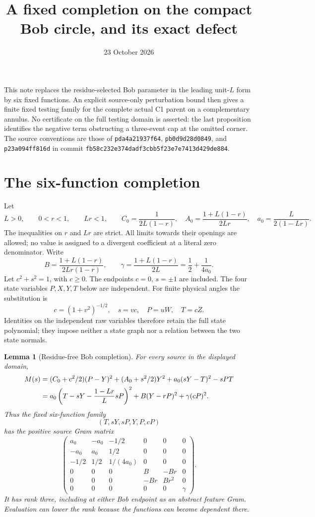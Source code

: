 \documentclass[11pt]{article}
\title{A fixed completion on the compact Bob circle, and its exact defect}
\author{}
\date{23 October 2026}
\newtheorem{lemma}{Lemma}
\begin{document}
\maketitle
\vspace{-1.5em}

This note replaces the residue-selected Bob parameter in the leading
unit-$L$ form by six fixed functions.  An explicit source-only
perturbation bound then gives a finite fixed testing family for the
complete actual C1 parent on a complementary annulus.  No certificate
on the full testing domain is asserted: the last proposition identifies
the negative term obstructing a three-event cap at the omitted corner.
The source conventions are those of
\texttt{pda4a21937f64}, \texttt{pb0d9d28d0849}, and
\texttt{p23a094ff816d} in commit
\texttt{fb58c232e374dadf3cbb5f23e7e7413d429de884}.

\section*{The six-function completion}

Let
\[
 L>0,\qquad 0<r<1,\qquad Lr<1,
 \qquad
 C_0=\frac1{2L(1-r)},\quad
 A_0=\frac{1+L(1-r)}{2Lr},\quad
 a_0=\frac L{2(1-Lr)}.
\]
The inequalities on $r$ and $Lr$ are strict.  All limits towards their
openings are allowed; no value is assigned to a divergent coefficient
at a literal zero denominator.  Write
\[
 B=\frac{1+L(1-r)}{2Lr(1-r)},\qquad
 \gamma=\frac{1+L(1-r)}{2L}
       =\frac12+\frac1{4a_0}.
\]
Let $c^2+s^2=1$, with $c\geq0$.  The endpoints $c=0$, $s=\pm1$
are included.  The four state variables $P,X,Y,T$ below are independent.
For finite physical angles the substitution is
\[
 c=(1+v^2)^{-1/2},\quad s=vc,\quad P=uW,\quad T=cZ.
\]
Identities on the independent raw variables therefore retain the full
state polynomial; they impose neither a state graph nor a relation
between the two state normals.

\begin{lemma}[Residue-free Bob completion]
For every source in the displayed domain,
\begin{align}
 M(s)&=(C_0+c^2/2)(P-Y)^2+(A_0+s^2/2)Y^2
             +a_0(sY-T)^2-sPT\notag\\
 &=a_0\left(T-sY-\frac{1-Lr}{L}sP\right)^2
        +B(Y-rP)^2+\gamma(cP)^2.                 \label{eq:three}
\end{align}
Thus the fixed six-function family
\[
 (T,sY,sP,Y,P,cP)
\]
has the positive source Gram matrix
\[
 \begin{pmatrix}
 a_0&-a_0&-1/2&0&0&0\\
 -a_0&a_0&1/2&0&0&0\\
 -1/2&1/2&1/(4a_0)&0&0&0\\
 0&0&0&B&-Br&0\\
 0&0&0&-Br&Br^2&0\\
 0&0&0&0&0&\gamma
 \end{pmatrix}.                                    \label{eq:sixgram}
\]
It has rank three, including at either Bob endpoint as an abstract
feature Gram.  Evaluation can lower the rank because the functions
can become dependent there.
\end{lemma}
\end{document}
